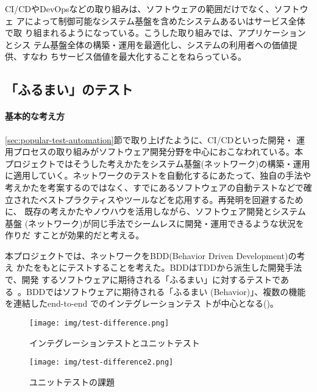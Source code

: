CI/CDやDevOpsなどの取り組みは、ソフトウェアの範囲だけでなく、ソフトウェ
アによって制御可能なシステム基盤を含めたシステムあるいはサービス全体で取
り組まれるようになっている。こうした取り組みでは、アプリケーションとシス
テム基盤全体の構築・運用を最適化し、システムの利用者への価値提供、すなわ
ちサービス価値を最大化することをねらっている。

  \subsection{「ふるまい」のテスト}
  \label{sec:behavior-test}


    \paragraph{基本的な考え方}
\ref{sec:popular-test-automation}節で取り上げたように、CI/CDといった開発・
運用プロセスの取り組みがソフトウェア開発分野を中心におこなわれている。本
プロジェクトではそうした考えかたをシステム基盤(ネットワーク)の構築・運用
に適用していく。ネットワークのテストを自動化するにあたって、独自の手法や
考えかたを考案するのではなく、すでにあるソフトウェアの自動テストなどで確
立されたベストプラクティスやツールなどを応用する。再発明を回避するために、
既存の考えかたやノウハウを活用しながら、ソフトウェア開発とシステム基盤
(ネットワーク)が同じ手法でシームレスに開発・運用できるような状況を作りだ
すことが効果的だと考える。

本プロジェクトでは、ネットワークをBDD(Behavior Driven Development)の考え
かたをもとにテストすることを考えた。BDDはTDDから派生した開発手法で、開発
するソフトウェアに期待される「ふるまい」に対するテストであ
る~\cite{wikipedia-bdd}。BDDではソフトウェアに期待される「ふるまい
(Behavior)」、複数の機能を連結したend-to-end でのインテグレーションテス
トが中心となる()。

\begin{figure}[h]
 \centering
 \begin{minipage}[c]{0.45\columnwidth}
  \centering
  \texttt{[image: img/test-difference.png]}
  \caption{インテグレーションテストとユニットテスト}
  \label{fig:test-difference}
 \end{minipage}
 \begin{minipage}[c]{0.45\columnwidth}
  \centering
  \texttt{[image: img/test-difference2.png]}
  \caption{ユニットテストの課題}
  \label{fig:test-difference2}
 \end{minipage}
\end{figure}

